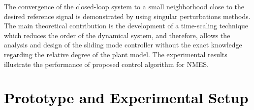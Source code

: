 \documentclass[review]{elsarticle}
\begin{document}
The convergence of the closed-loop system to a small neighborhood close to the desired reference signal is demonstrated by using
singular perturbations methods. The main theoretical contribution is the development of a time-scaling technique which reduces the order of the dynamical system, and therefore, allows the analysis and design of the sliding mode controller without the exact knowledge
\textcolor{black}{regarding} the relative degree of the plant model. The experimental results illustrate the performance of proposed control algorithm for NMES.

 

\section{\textcolor{black}{Prototype and Experimental Setup}}
\label{protocol}
\end{document}
